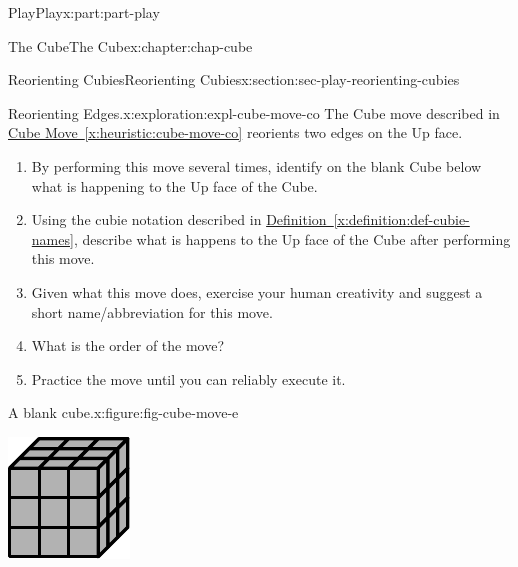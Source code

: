 \documentclass[oneside,10pt,]{book}
\newcommand{\xreffont}{\relax}
\numberwithin{equation}{section}
\begin{document}
\begin{partptx}{Play}{}{Play}{}{}{x:part:part-play}
\begin{chapterptx}{The Cube}{}{The Cube}{}{}{x:chapter:chap-cube}
\begin{sectionptx}{Reorienting Cubies}{}{Reorienting Cubies}{}{}{x:section:sec-play-reorienting-cubies}
\begin{exploration}{Reorienting Edges.}{x:exploration:expl-cube-move-co}
The Cube move described in \hyperref[x:heuristic:cube-move-co]{Cube Move~{\xreffont\ref{x:heuristic:cube-move-co}}} reorients two edges on the Up face.%
%
\begin{enumerate}
\item{}By performing this move several times, identify on the blank Cube below what is happening to the Up face of the Cube.%
\item{}Using the cubie notation described in \hyperref[x:definition:def-cubie-names]{Definition~{\xreffont\ref{x:definition:def-cubie-names}}}, describe what is happens to the Up face of the Cube after performing this move.%
\item{}Given what this move does, exercise your human creativity and suggest a short name\slash{}abbreviation for this move.%
\item{}What is the order of the move?%
\item{}Practice the move until you can reliably execute it.%
\end{enumerate}
\begin{figureptx}{A blank cube.}{x:figure:fig-cube-move-e}{}%
\begin{image}{0.25}{0.5}{0.25}%
\includegraphics[width=\linewidth]{./images/grey_cube.pdf}
\end{image}%
\tcblower
\end{figureptx}%

\end{exploration}
\end{sectionptx}
\end{chapterptx}
\end{partptx}
\end{document}
